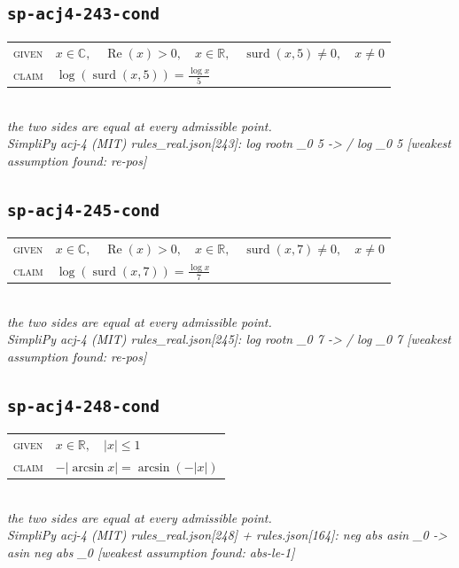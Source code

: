 \documentclass[11pt]{article}
\begin{document}
\subsection*{\texttt{sp-acj4-243-cond}}
\begin{tabular}{@{}l@{\quad}l@{}}
\textsc{given} & $x \in \mathbb{C},\quad \operatorname{Re}\left(x\right) > 0,\quad x \in \mathbb{R},\quad \operatorname{surd}\left(x, 5\right) \neq 0,\quad x \neq 0$ \\[4pt]
\textsc{claim} & $\displaystyle \log\left(\operatorname{surd}\left(x, 5\right)\right) = \frac{\log x}{5}$ \\
\end{tabular}\\[2pt]
{\small\emph{the two sides are equal at every admissible point.}}\\
\emph{SimpliPy acj-4 (MIT) rules\_real.json[243]: log rootn \_0 5  ->  / log \_0 5  [weakest assumption found: re-pos]}\\

\subsection*{\texttt{sp-acj4-245-cond}}
\begin{tabular}{@{}l@{\quad}l@{}}
\textsc{given} & $x \in \mathbb{C},\quad \operatorname{Re}\left(x\right) > 0,\quad x \in \mathbb{R},\quad \operatorname{surd}\left(x, 7\right) \neq 0,\quad x \neq 0$ \\[4pt]
\textsc{claim} & $\displaystyle \log\left(\operatorname{surd}\left(x, 7\right)\right) = \frac{\log x}{7}$ \\
\end{tabular}\\[2pt]
{\small\emph{the two sides are equal at every admissible point.}}\\
\emph{SimpliPy acj-4 (MIT) rules\_real.json[245]: log rootn \_0 7  ->  / log \_0 7  [weakest assumption found: re-pos]}\\

\subsection*{\texttt{sp-acj4-248-cond}}
\begin{tabular}{@{}l@{\quad}l@{}}
\textsc{given} & $x \in \mathbb{R},\quad \left|x\right| \le 1$ \\[4pt]
\textsc{claim} & $\displaystyle -\left|\arcsin x\right| = \arcsin\left(-\left|x\right|\right)$ \\
\end{tabular}\\[2pt]
{\small\emph{the two sides are equal at every admissible point.}}\\
\emph{SimpliPy acj-4 (MIT) rules\_real.json[248] + rules.json[164]: neg abs asin \_0  ->  asin neg abs \_0  [weakest assumption found: abs-le-1]}\\
\end{document}
